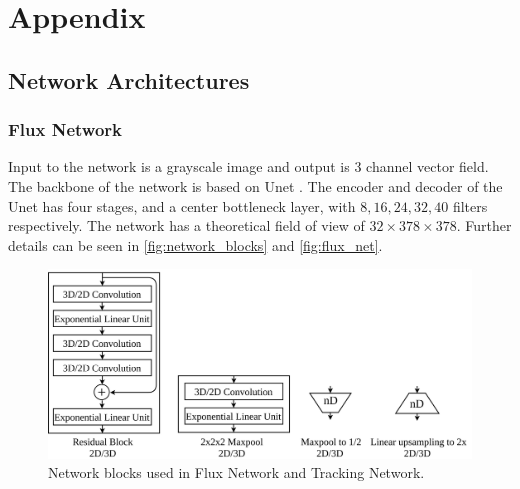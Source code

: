
\chapter{Appendix}\label{chapter:appendix}

\section{Network Architectures}

\subsection{Flux Network}
Input to the network is a grayscale image and output is 3 channel vector field.
The backbone of the network is based on Unet \cite{ronneberger2015}. The encoder and decoder of the Unet has four stages, and a center bottleneck layer, with $8, 16, 24, 32, 40$ filters respectively. The network has a theoretical field of view of $32\times378\times378$. Further details can be seen in \autoref{fig:network_blocks} and \autoref{fig:flux_net}.

\begin{figure}[ht]
	\centering
	\includegraphics[width=\textwidth]{figures/network/legend.png}
	\caption{Network blocks used in Flux Network and Tracking Network.}
	\label{fig:network_blocks}
\end{figure}


